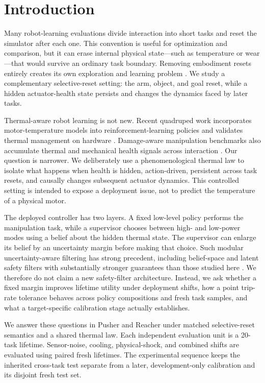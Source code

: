 \section{Introduction}
\label{sec:introduction}

Many robot-learning evaluations divide interaction into short tasks and reset
the simulator after each one. This convention is useful for optimization and
comparison, but it can erase internal physical state---such as temperature or
wear---that would survive an ordinary task boundary. Removing embodiment resets
entirely creates its own exploration and learning problem
\citep{farrahi2025continuing}. We study a complementary selective-reset
setting: the arm, object, and goal reset, while a hidden actuator-health state
persists and changes the dynamics faced by later tasks.

Thermal-aware robot learning is not new. Recent quadruped work incorporates
motor-temperature models into reinforcement-learning policies and validates
thermal management on hardware \citep{qian2026thermal,wan2026residual}.
Damage-aware manipulation benchmarks also accumulate thermal and mechanical
health signals across interaction \citep{balaji2026oopsieverse}. Our question
is narrower. We deliberately use a phenomenological thermal law to isolate
what happens when health is hidden, action-driven, persistent across task
resets, and causally changes subsequent actuator dynamics. This controlled
setting is intended to expose a deployment issue, not to predict the
temperature of a physical motor.

The deployed controller has two layers. A fixed low-level policy performs the
manipulation task, while a supervisor chooses between high- and low-power modes
using a belief about the hidden thermal state. The supervisor can enlarge its
belief by an uncertainty margin before making that choice. Such modular
uncertainty-aware filtering has strong precedent, including belief-space and
latent safety filters with substantially stronger guarantees than those studied
here \citep{vahs2024risk,seo2025latent,kwon2026adaptive}. We therefore do not
claim a new safety-filter architecture. Instead, we ask whether a fixed margin
improves lifetime utility under deployment shifts, how a point trip-rate
tolerance behaves across policy compositions and fresh task samples, and what
a target-specific calibration stage actually establishes.

We answer these questions in Pusher and Reacher under matched selective-reset
semantics and a shared thermal law. Each independent evaluation unit is a
20-task lifetime. Sensor-noise, cooling, physical-shock, and combined shifts
are evaluated using paired fresh lifetimes. The experimental sequence keeps
the inherited cross-task test separate from a later, development-only
calibration and its disjoint fresh test set.

